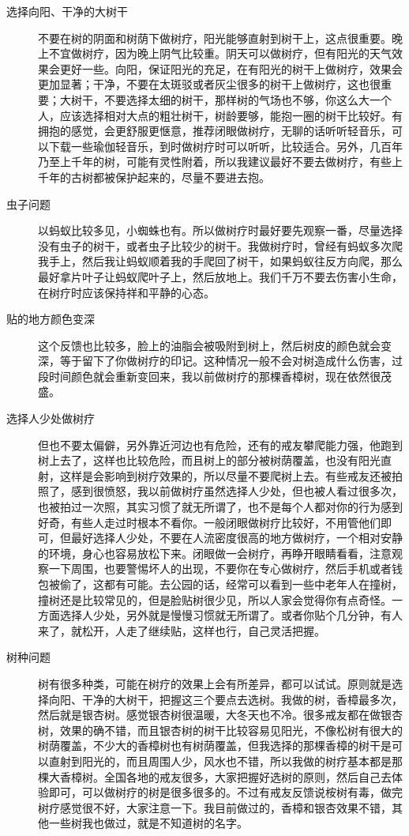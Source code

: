\begin{description}
    \item[选择向阳、干净的大树干] 不要在树的阴面和树荫下做树疗，阳光能够直射到树干上，这点很重要。晚上不宜做树疗，因为晚上阴气比较重。阴天可以做树疗，但有阳光的天气效果会更好一些。向阳，保证阳光的充足，在有阳光的树干上做树疗，效果会更加显著；干净，不要在太斑驳或者灰尘很多的树干上做树疗，这也很重要；大树干，不要选择太细的树干，那样树的气场也不够，你这么大一个人，应该选择相对大点的粗壮树干，树龄要够，能抱一圈的树干比较好。有拥抱的感觉，会更舒服更惬意，推荐闭眼做树疗，无聊的话听听轻音乐，可以下载一些瑜伽轻音乐，到时做树疗时可以听听，比较适合。另外，几百年乃至上千年的树，可能有灵性附着，所以我建议最好不要去做树疗，有些上千年的古树都被保护起来的，尽量不要进去抱。
    \item[虫子问题] 以蚂蚁比较多见，小蜘蛛也有。所以做树疗时最好要先观察一番，尽量选择没有虫子的树干，或者虫子比较少的树干。我做树疗时，曾经有蚂蚁多次爬我手上，然后我让蚂蚁顺着我的手爬回了树干，如果蚂蚁往反方向爬，那么最好拿片叶子让蚂蚁爬叶子上，然后放地上。我们千万不要去伤害小生命，在树疗时应该保持祥和平静的心态。
    \item[贴的地方颜色变深] 这个反馈也比较多，脸上的油脂会被吸附到树上，然后树皮的颜色就会变深，等于留下了你做树疗的印记。这种情况一般不会对树造成什么伤害，过段时间颜色就会重新变回来，我以前做树疗的那棵香樟树，现在依然很茂盛。
    \item[选择人少处做树疗] 但也不要太偏僻，另外靠近河边也有危险，还有的戒友攀爬能力强，他跑到树上去了，这样也比较危险，而且树上的部分被树荫覆盖，也没有阳光直射，这样是会影响到树疗效果的，所以尽量不要爬树上去。有些戒友还被拍照了，感到很愤怒，我以前做树疗虽然选择人少处，但也被人看过很多次，也被拍过一次照，其实习惯了就无所谓了，也不是每个人都对你的行为感到好奇，有些人走过时根本不看你。一般闭眼做树疗比较好，不用管他们即可，但最好选择人少处，不要在人流密度很高的地方做树疗，一个相对安静的环境，身心也容易放松下来。闭眼做一会树疗，再睁开眼睛看看，注意观察一下周围，也要警惕坏人的出现，不要你在专心做树疗，然后手机或者钱包被偷了，这都有可能。去公园的话，经常可以看到一些中老年人在撞树，撞树还是比较常见的，但是脸贴树很少见，所以人家会觉得你有点奇怪。一方面选择人少处，另外就是慢慢习惯就无所谓了。或者你贴个几分钟，有人来了，就松开，人走了继续贴，这样也行，自己灵活把握。
    \item[树种问题] 树有很多种类，可能在树疗的效果上会有所差异，都可以试试。原则就是选择向阳、干净的大树干，把握这三个要点去选树。我做的树，香樟最多次，然后就是银杏树。感觉银杏树很温暖，大冬天也不冷。很多戒友都在做银杏树，效果的确不错，而且银杏树的树干比较容易见阳光，不像松树有很大的树荫覆盖，不少大的香樟树也有树荫覆盖，但我选择的那棵香樟的树干是可以直射到阳光的，而且周围人少，风水也不错，所以我做的树疗基本都是那棵大香樟树。全国各地的戒友很多，大家把握好选树的原则，然后自己去体验即可，可以做树疗的树是很多很多的。不过有戒友反馈说桉树有毒，做完树疗感觉很不好，大家注意一下。我目前做过的，香樟和银杏效果不错，其他一些树我也做过，就是不知道树的名字。
\end{description}


